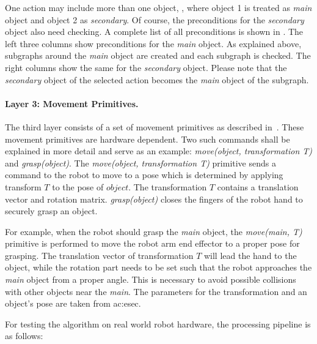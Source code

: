 One action may include more than one object, \eg {}, where object 1 is treated as \emph{main} object and object 2 as \emph{secondary}.
Of course, the preconditions for the \emph{secondary} object also need checking.
A complete list of all preconditions is shown in .
The left three columns show preconditions for the \emph{main} object.
As explained above, subgraphs around the \emph{main} object are created and each subgraph is checked.
The right columns show the same for the \emph{secondary} object.
Please note that the \emph{secondary} object of the selected action becomes the \emph{main} object of the subgraph.


\paragraph{Layer 3: Movement Primitives.} The third layer consists of a set of movement primitives as described in~\cite{aeinaksoytamosiunaite2013}. 
These movement primitives are hardware dependent.
Two such commands shall be explained in more detail and serve as an example: \emph{move(object, transformation T)} and \emph{grasp(object)}.
The \emph{move(object, transformation T)} primitive sends a command to the robot to move to a pose which is determined by applying transform $T$ to the pose of $object$. 
The transformation $T$ contains a translation vector and rotation matrix.
\emph{grasp(object)} closes the fingers of the robot hand to securely grasp an object.


For example, when the robot should grasp the \emph{main} object, the \emph{move(main, T)} primitive is performed to move the robot arm end effector to a proper pose for grasping. 
The translation vector of transformation $T$ will lead the hand to the object, while the rotation part needs to be set such that the robot approaches the \emph{main} object from a proper angle.
This is necessary to avoid possible collisions with other objects near the \emph{main}.
The parameters for the transformation and an object's pose are taken from \gls{ac:esec}.


For testing the algorithm on real world robot hardware, the processing pipeline is as follows:


